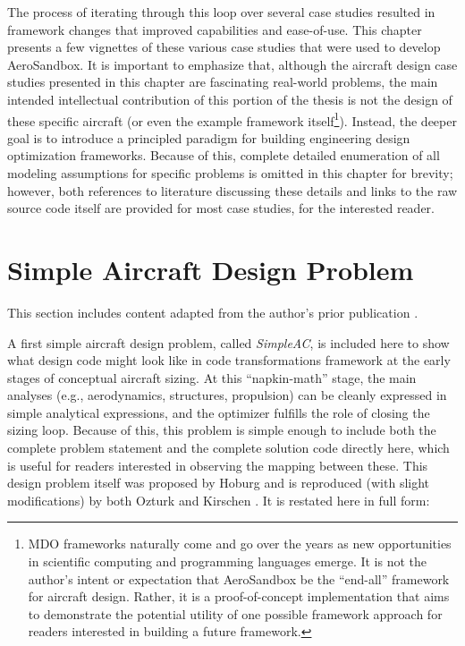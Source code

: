 The process of iterating through this loop over several case studies resulted in framework changes that improved capabilities and ease-of-use. This chapter presents a few vignettes of these various case studies that were used to develop AeroSandbox. It is important to emphasize that, although the aircraft design case studies presented in this chapter are fascinating real-world problems, the main intended intellectual contribution of this portion of the thesis is not the design of these specific aircraft (or even the example framework itself\footnote{MDO frameworks naturally come and go over the years as new opportunities in scientific computing and programming languages emerge. It is not the author's intent or expectation that AeroSandbox be the ``end-all'' framework for aircraft design. Rather, it is a proof-of-concept implementation that aims to demonstrate the potential utility of one possible framework approach for readers interested in building a future framework.}). Instead, the deeper goal is to introduce a principled paradigm for building engineering design optimization frameworks. Because of this, complete detailed enumeration of all modeling assumptions for specific problems is omitted in this chapter for brevity; however, both references to literature discussing these details and links to the raw source code itself are provided for most case studies, for the interested reader.


\section{Simple Aircraft Design Problem}
\label{sec:simpleac}

\begin{attrib}
    This section includes content adapted from the author's prior publication \cite{sharpe_aerosandbox_2021}.
\end{attrib}

A first simple aircraft design problem, called \emph{SimpleAC}, is included here to show what design code might look like in code transformations framework at the early stages of conceptual aircraft sizing. At this ``napkin-math'' stage, the main analyses (e.g., aerodynamics, structures, propulsion) can be cleanly expressed in simple analytical expressions, and the optimizer fulfills the role of closing the sizing loop. Because of this, this problem is simple enough to include both the complete problem statement and the complete solution code directly here, which is useful for readers interested in observing the mapping between these. This design problem itself was proposed by Hoburg \cite{hoburg} and is reproduced (with slight modifications) by both Ozturk \cite{Ozturk2018} and Kirschen \cite{kirschen}. It is restated here in full form:

